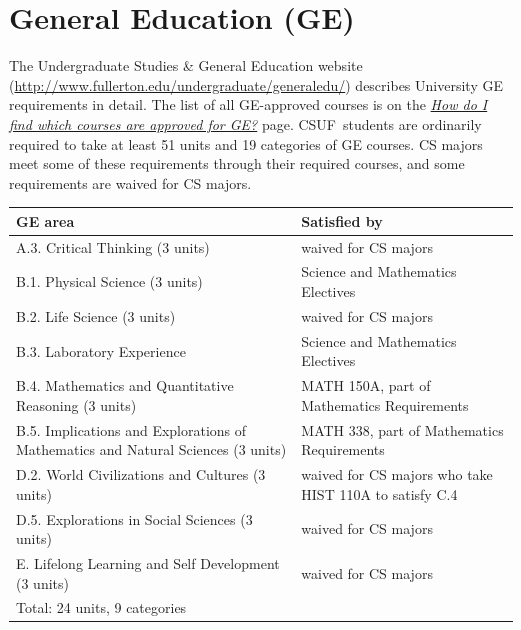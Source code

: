 \documentclass{book}
\newcommand{\CampusName}{CSUF}
\begin{document}
\section{General Education (GE)}

\newcommand{\gecourselist}{ \href{http://www.fullerton.edu/undergraduate/generaledu/ge_approvedcourses.asp}{\emph{How do I find which courses are approved for GE?}} }

The Undergraduate Studies \& General Education website (\url{http://www.fullerton.edu/undergraduate/generaledu/}) describes University GE requirements in detail. The list of all GE-approved courses is on the \gecourselist page. \CampusName~students are ordinarily required to take at least 51 units and 19 categories of GE courses. CS majors meet some of these requirements through their required courses, and some requirements are waived for CS majors.

\begin{center}
\begin{tabular}{| p{3in} | p{3in} |} \hline
  \textbf{GE area} & \textbf{Satisfied by} \\ \hline
  A.3. Critical Thinking (3 units) & waived for CS majors \\ \hline
  B.1. Physical Science (3 units) & Science and Mathematics Electives \\ \hline
  B.2. Life Science (3 units) & waived for CS majors \\ \hline
  B.3. Laboratory Experience & Science and Mathematics Electives \\ \hline
  B.4. Mathematics and Quantitative Reasoning (3 units) & MATH 150A, part of Mathematics Requirements \\ \hline
  B.5. Implications and Explorations of Mathematics and Natural Sciences (3 units) & MATH 338, part of Mathematics Requirements \\ \hline
  D.2. World Civilizations and Cultures (3 units) & waived for CS majors who take HIST 110A to satisfy C.4 \\ \hline
  D.5. Explorations in Social Sciences (3 units) & waived for CS majors \\ \hline
  E. Lifelong Learning and Self Development (3 units) & waived for CS majors \\ \hline
  \multicolumn{2}{|l|}{Total: 24 units, 9 categories} \\ \hline
\end{tabular}
\end{center}
\end{document}
